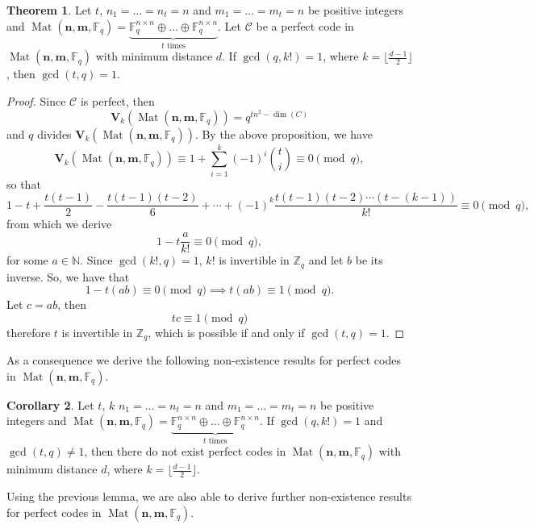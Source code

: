\documentclass[11pt]{amsart}
\DeclareMathOperator{\Mat}{Mat}
\theoremstyle{definition}
\newtheorem{theorem}{Theorem}[section]
\newtheorem{corollary}[theorem]{Corollary}
\newcommand{\F}{{\mathbb F}}
\newcommand{\NN}{{\mathbb N}}
\newcommand{\bfn}{\mathbf {n}}
\newcommand{\bfm}{\mathbf {m}}
\newcommand{\spacmn}{\Mat(\bfn,\bfm,\F_q)}
\begin{document}
\begin{theorem}\label{thm:conddivis1}
Let $t$, $ n_1 = \ldots = n_t = n $ and $ m_1 = \ldots = m_t = n $ be positive integers and $\spacmn=\underbrace{\mathbb{F}_q^{n\times n}\oplus \ldots \oplus \F_q^{n\times n}}_{t \text{ times}}$.
Let $\mathcal{C}$ be a perfect code in $\spacmn$ with minimum distance $d$. If $\gcd(q,k!)=1$, where $k=\lfloor\frac{d-1}{2}\rfloor$, then $\gcd(t,q)=1$.
\end{theorem}
\begin{proof}
Since $\mathcal{C}$ is perfect, then
\[
\mathbf{V}_k(\spacmn)=q^{tn^2-\dim(C)}
\]
and $q$ divides $\mathbf{V}_k(\spacmn)$. 
By the above proposition, we have
\[
\mathbf{V}_k(\spacmn)\equiv 1+\sum_{i=1}^{k}(-1)^i\binom{t}{i}\equiv0\pmod{q},
\]
so that
\[
1-t+\frac{t(t-1)}{2}-\frac{t(t-1)(t-2)}{6}+\cdots+(-1)^k\frac{t(t-1)(t-2)\cdots(t-(k-1))}{k!}\equiv0 \pmod q,
\]
from which we derive
\[
1-t\frac{a}{k!}\equiv0 \pmod q,
\]
for some $a \in \NN$. Since $\gcd(k!,q)=1$, $k!$ is invertible in $\mathbb{Z}_q$ and let $b$ be its inverse. 
So, we have that
\[
1-t(ab)\equiv0\pmod{q}\implies t(ab)\equiv1\pmod q.
\]
Let $c=ab$, then
\[
tc\equiv1\pmod{q}
\]
therefore $t$ is invertible in $\mathbb{Z}_q$, which is possible if and only if $\gcd(t,q)=1$.
\end{proof}

As a consequence we derive the following non-existence results for perfect codes in $\spacmn$.

\begin{corollary}
Let $t$, $k$ $ n_1 = \ldots = n_t = n $ and $ m_1 = \ldots = m_t = n $ be positive integers and $\spacmn=\underbrace{\mathbb{F}_q^{n\times n}\oplus \ldots \oplus \F_q^{n\times n}}_{t \text{ times}}$.
If $\gcd(q,k!)=1$ and $\gcd(t,q)\ne1$, then there do not exist perfect codes in $\spacmn$ with minimum distance $d$, where $k=\lfloor\frac{d-1}{2}\rfloor$.
\end{corollary}

Using the previous lemma, we are also able to derive further non-existence results for perfect codes in $\spacmn$.
\end{document}
